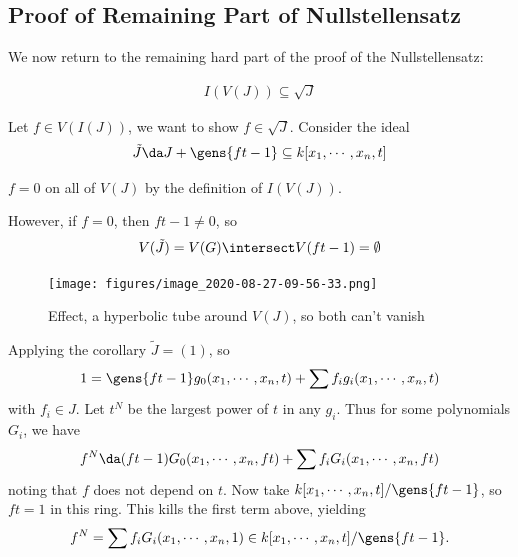 \hypertarget{proof-of-remaining-part-of-nullstellensatz}{%
\subsection{Proof of Remaining Part of
Nullstellensatz}\label{proof-of-remaining-part-of-nullstellensatz}}

We now return to the remaining hard part of the proof of the
Nullstellensatz:

\begin{align*}
I(V(J)) \subseteq \sqrt{J}
\end{align*}

Let \(f\in V(I(J))\), we want to show \(f\in \sqrt{J}\). Consider the
ideal
\begin{align*}
\tilde J \da J + \gens{ft - 1} \subseteq k[x_1, \cdots, x_n, t]
\end{align*}

\begin{observation}

\(f = 0\) on all of \(V(J)\) by the definition of \(I(V(J))\).

\end{observation}

However, if \(f=0\), then \(ft-1 \neq 0\), so
\begin{align*}
V(\tilde J) = V(G) \intersect V(ft-1) = \emptyset
\end{align*}

\begin{figure}
\centering
\texttt{[image: figures/image\_2020-08-27-09-56-33.png]}
\caption{Effect, a hyperbolic tube around \(V(J)\), so both can't
vanish}
\end{figure}

Applying the corollary \(\tilde J = (1)\), so
\begin{align*}
1 = \gens{ft-1} g_0(x_1, \cdots, x_n, t) + \sum f_i g_i(x_1, \cdots, x_n, t)
\end{align*} with \(f_i \in J\). Let \(t^N\) be the largest power of
\(t\) in any \(g_i\). Thus for some polynomials \(G_i\), we have
\begin{align*}  
f^N \da (ft-1) G_0(x_1, \cdots, x_n, ft) + \sum f_i G_i(x_1, \cdots, x_n, ft)
\end{align*} noting that \(f\) does not depend on \(t\). Now take
\(k[x_1, \cdots, x_n, t]/\gens{ft-1}\), so \(ft=1\) in this ring. This
kills the first term above, yielding
\begin{align*}  
f^N = \sum f_i G_i(x_1, \cdots, x_n, 1) \in k[x_1, \cdots, x_n, t]/\gens{ft-1}
.\end{align*}

